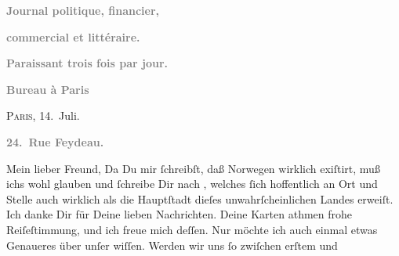 \begin{ledgroupsized}[t]{13cm}
           \begin{otherlanguage}{french}\textcolor{gray}{\textbf{Journal politique,
                        financier,}}\end{otherlanguage}\pend
           \pstart
           \begin{otherlanguage}{french}\textcolor{gray}{\textbf{commercial et littéraire.}}\end{otherlanguage}\pend
           \pstart
           \begin{otherlanguage}{french}\textcolor{gray}{\textbf{\textbf{Paraissant trois fois par jour.}}}\end{otherlanguage}\pend
           \pstart
           \begin{otherlanguage}{french}\textcolor{gray}{\textbf{\textbf{Bureau à Paris}}}\end{otherlanguage}\hfill \textsc{Paris}, 14. Juli.\pend
           \pstart
           \begin{otherlanguage}{french}\textcolor{gray}{\textbf{\textbf{24. Rue Feydeau.}}}\end{otherlanguage}\pend
           \pstart\center{}Mein lieber Freund,\pend\pstart
           Da Du mir ſchreibſt, daß Norwegen wirklich
               exiſtirt, muß ichs wohl glauben und ſchreibe Dir nach \label{K_L02781-1v}\label{K_L02781-1h}, welches ſich hoffentlich an Ort und Stelle auch
               wirklich als die Hauptſtadt
               dieſes unwahrſcheinlichen Landes erweiſt.\pend
           \pstart
           Ich danke Dir für Deine lieben Nachrichten. Deine Karten athmen frohe Reiſeſtimmung,
               und ich freue mich deſſen.\pend
           \pstart
           {\pb}Nur möchte ich auch einmal etwas Genaueres über
               unſer \label{K_L02781-2v}\label{K_L02781-2h} wiſſen. Werden wir uns ſo zwiſchen erſtem und

\end{ledgroupsized}
